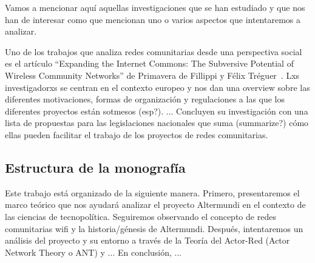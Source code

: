 Vamos a mencionar aquí aquellas investigaciones que se han estudiado y que nos han de interesar como que mencionan uno o varios aspectos que intentaremos a analizar.

Uno de los trabajos que analiza redes comunitarias desde una perspectiva social es el artículo ``Expanding the Internet Commons: The Subversive Potential of Wireless Community Networks'' de Primavera de Fillippi y Félix Tréguer~\autocite{FiTre2015}.
Lxs investigadorxs se centran en el contexto europeo y nos dan una overview sobre las diferentes motivaciones, formas de organización y regulaciones a las que los diferentes proyectos están sotmesos (esp?).
...
Concluyen su investigación con una lista de propuestas para las legislaciones nacionales que suma (summarize?) cómo ellas pueden facilitar el trabajo de los proyectos de redes comunitarias.


\subsection{Estructura de la monografía}

Este trabajo está organizado de la siguiente manera.
Primero, presentaremos el marco teórico que nos ayudará analizar el proyecto Altermundi en el contexto de las ciencias de tecnopolítica.
Seguiremos observando el concepto de redes comunitarias wifi y la historia/génesis de Altermundi.
Después, intentaremos un análisis del proyecto y su entorno a través de la Teoría del Actor-Red (Actor Network Theory o ANT) y ...
En conclusión, ...

